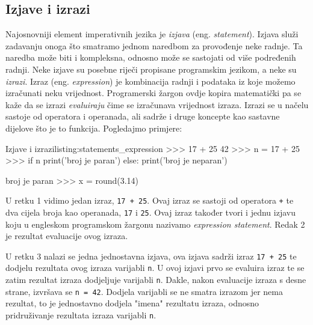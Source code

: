 \subsection{Izjave i izrazi}

Najosnovniji element imperativnih jezika je \textit{izjava} (eng. \textit{statement}). Izjava služi zadavanju onoga što smatramo jednom naredbom za provođenje neke radnje. Ta naredba može biti i kompleksna, odnosno može se sastojati od više podređenih radnji. Neke izjave su posebne riječi propisane programskim jezikom, a neke su \textit{izrazi}. Izraz (eng. \textit{expression}) je kombinacija radnji i podataka iz koje možemo izračunati neku vrijednost. Programerski žargon ovdje kopira matematički pa se kaže da se izrazi \textit{evaluiraju} čime se izračunava vrijednost izraza. Izrazi se u načelu sastoje od operatora i operanada, ali sadrže i druge koncepte kao sastavne dijelove što je to funkcija. Pogledajmo primjere:


\begin{python}{Izjave i izrazi}{listing:statements_expression}
>>> 17 + 25
42
>>> n = 17 + 25
>>> if n %
    print('broj je paran')
else:
    print('broj je neparan')


broj je paran
>>> x = round(3.14)
\end{python}

U retku 1 vidimo jedan izraz, \texttt{17 + 25}. Ovaj izraz se sastoji od operatora \texttt{+} te dva cijela broja kao operanada, \texttt{17} i \texttt{25}. Ovaj izraz također tvori i jednu izjavu koju u engleskom programskom žargonu nazivamo \textit{expression statement}. Redak 2 je rezultat evaluacije ovog izraza.

U retku 3 nalazi se jedna jednostavna izjava, ova izjava sadrži izraz \texttt{17 + 25} te dodjelu rezultata ovog izraza varijabli \texttt{n}. U ovoj izjavi prvo se evaluira izraz te se zatim rezultat izraza dodjeljuje varijabli \texttt{n}. Dakle, nakon evaluacije izraza s desne strane, izvršava se \texttt{n = 42}. Dodjela varijabli se ne smatra izrazom jer nema rezultat, to je jednostavno dodjela "imena" rezultatu izraza, odnosno pridruživanje rezultata izraza varijabli \texttt{n}.

